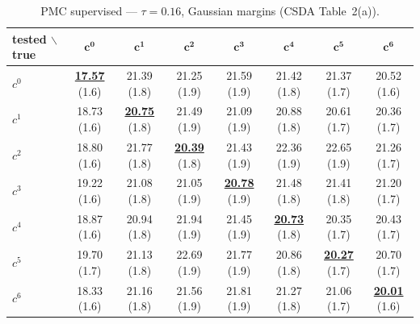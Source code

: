 \begin{table}[htbp]
  \centering
  \small
  \setlength{\tabcolsep}{4pt}
  \caption{PMC supervised — $\tau = 0.16$, Gaussian margins (CSDA Table~2(a)).}
  \label{tab:exp1-low_tau_gauss}
  \begin{tabular}{lccccccc}
    \toprule
    tested $\backslash$ true & $\mathbf{c^{0}}$ & $\mathbf{c^{1}}$ & $\mathbf{c^{2}}$ & $\mathbf{c^{3}}$ & $\mathbf{c^{4}}$ & $\mathbf{c^{5}}$ & $\mathbf{c^{6}}$ \\
    \midrule
    $c^{0}$ & \textbf{\underline{17.57}} (1.6) & 21.39 (1.8) & 21.25 (1.9) & 21.59 (1.9) & 21.42 (1.8) & 21.37 (1.7) & 20.52 (1.6) \\
    $c^{1}$ & 18.73 (1.6) & \textbf{\underline{20.75}} (1.8) & 21.49 (1.9) & 21.09 (1.9) & 20.88 (1.8) & 20.61 (1.7) & 20.36 (1.7) \\
    $c^{2}$ & 18.80 (1.6) & 21.77 (1.8) & \textbf{\underline{20.39}} (1.8) & 21.43 (1.9) & 22.36 (1.9) & 22.65 (1.9) & 21.26 (1.7) \\
    $c^{3}$ & 19.22 (1.6) & 21.08 (1.8) & 21.05 (1.9) & \textbf{\underline{20.78}} (1.9) & 21.48 (1.8) & 21.41 (1.8) & 21.20 (1.7) \\
    $c^{4}$ & 18.87 (1.6) & 20.94 (1.8) & 21.94 (1.9) & 21.45 (1.9) & \textbf{\underline{20.73}} (1.8) & 20.35 (1.7) & 20.43 (1.7) \\
    $c^{5}$ & 19.70 (1.7) & 21.13 (1.8) & 22.69 (1.9) & 21.77 (1.9) & 20.86 (1.8) & \textbf{\underline{20.27}} (1.7) & 20.70 (1.7) \\
    $c^{6}$ & 18.33 (1.6) & 21.16 (1.8) & 21.56 (1.9) & 21.81 (1.9) & 21.27 (1.8) & 21.06 (1.7) & \textbf{\underline{20.01}} (1.6) \\
    \bottomrule
  \end{tabular}
\end{table}
